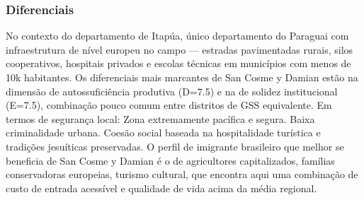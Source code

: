 \subsubsection*{Diferenciais}\label{dif-san-cosme-y-damian-0719}
No contexto do departamento de Itapúa, único departamento do Paraguai com infraestrutura de nível europeu no campo — estradas pavimentadas rurais, silos cooperativos, hospitais privados e escolas técnicas em municípios com menos de 10k habitantes. Os diferenciais mais marcantes de San Cosme y Damian estão na dimensão de autossuficiência produtiva (D=7.5) e na de solidez institucional (E=7.5), combinação pouco comum entre distritos de GSS equivalente. Em termos de segurança local: Zona extremamente pacífica e segura. Baixa criminalidade urbana. Coesão social baseada na hospitalidade turística e tradições jesuíticas preservadas. O perfil de imigrante brasileiro que melhor se beneficia de San Cosme y Damian é o de agricultores capitalizados, famílias conservadoras europeias, turismo cultural, que encontra aqui uma combinação de custo de entrada acessível e qualidade de vida acima da média regional.
